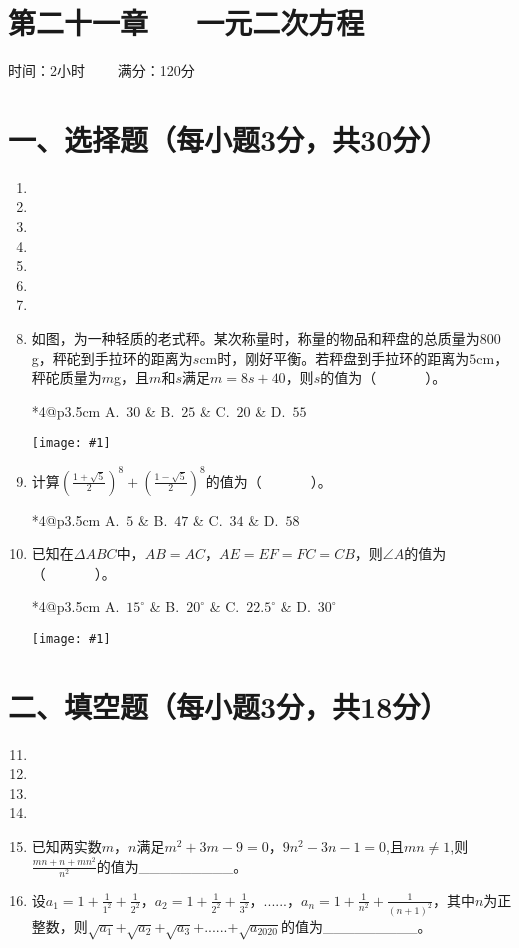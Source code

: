 \documentclass[10pt]{article}
\makeatletter
\renewcommand{\underline}{\_\_\_\_\_\_\_\_\_}
\newcommand{\onp} [4] { \\
    \begin{tabular} {*{4}{@{}p{3.5cm}}}
        A.~#1 & B.~#2 & C.~#3 & D.~#4
    \end{tabular}
}
\newcommand{\smallpicture}[2]{\texttt{[image: \#1]}}
\makeatother
\begin{document}
\section*{\centering 第二十一章~~~一元二次方程}
\centerline{时间：2小时 \ \ \ \ 满分：120分}
\section*{\normalsize 一、选择题（每小题3分，共30分）}
\begin{enumerate}\setcounter{enumi}{0}
    \item %
    \item %
    \item %
    \item %
    \item %
    \item %
    \item %
    \item 如图，为一种轻质的老式秤。某次称量时，称量的物品和秤盘的总质量为$800$g，秤砣到手拉环的距离为$s$cm时，刚好平衡。若秤盘到手拉环的距离为$5$cm，秤砣质量为$m$g，且$m$和$s$满足$m=8s+40$，则$s$的值为（~~~~~~~）。
    \onp{$30$}{$25$}{$20$}{$55$}\smallpicture{./images/T8.png}{1}
    \item 计算$(\frac{1+\sqrt{5}}{2})^8+(\frac{1-\sqrt{5}}{2})^8$的值为（~~~~~~~）。
    \onp{$5$}{$47$}{$34$}{$58$}
    \item 已知在$\Delta ABC$中，$AB = AC$，$AE = EF = FC = CB$，则$\angle A$的值为（~~~~~~~）。
    \onp{$15^{\circ}$}{$20^{\circ}$}{$22.5^{\circ}$}{$30^{\circ}$}\smallpicture{./images/T10.png}{1}
\end{enumerate}
\section*{\normalsize 二、填空题（每小题3分，共18分）}
\begin{enumerate}\setcounter{enumi}{10}
    \item %
    \item %
    \item %
    \item %
    \item 已知两实数$m$，$n$满足$m^2+3m-9=0$，$9n^2-3n-1=0$,且$mn \neq 1$,则$\frac{mn+n+mn^{2}}{n^{2}}$的值为\underline{}。
    \item 设$a_{1} = 1 + \frac{1}{1^{2}} + \frac{1}{2^{2}} $，$ a_{2} = 1 + \frac{1}{2^{2}} + \frac{1}{3^{2}}   $，......，$a_{n} = 1 + \frac{1}{n^{2}} + \frac{1}{(n + 1)^{2}}$，其中$n$为正整数，则$\sqrt{a_{1}}$+$\sqrt{a_{2}}$+$\sqrt{a_{3}}$+......+$\sqrt{a_{2020}}$的值为\underline{}。
\end{enumerate}
\end{document}
